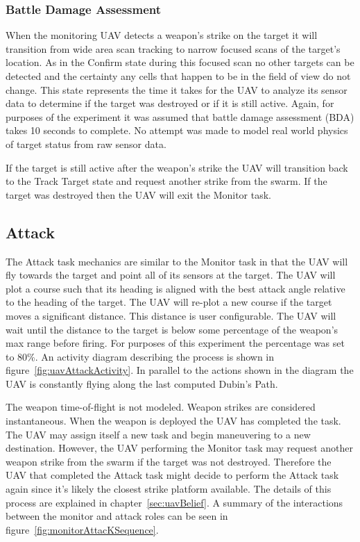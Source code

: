 \begin{multicols*}{2}
\subsubsection{Battle Damage Assessment}
When the monitoring UAV detects a weapon's strike on the target it will transition from wide area scan tracking to narrow focused scans of the target's location.  As in the Confirm state during this focused scan no other targets can be detected and the certainty any cells that happen to be in the field of view do not change.  This state represents the time it takes for the UAV to analyze its sensor data to determine if the target was destroyed or if it is still active.  Again, for purposes of the experiment it was assumed that battle damage assessment (BDA) takes 10 seconds to complete.  No attempt was made to model real world physics of target status from raw sensor data.

If the target is still active after the weapon's strike the UAV will transition back to the Track Target state and request another strike from the swarm.  If the target was destroyed then the UAV will exit the Monitor task.


\subsection{Attack}
The Attack task mechanics are similar to the Monitor task in that the UAV will fly towards the target and point all of its sensors at the target.  The UAV will plot a course such that its heading is aligned with the best attack angle relative to the heading of the target.  The UAV will re-plot a new course if the target moves a significant distance.  This distance is user configurable.  The UAV will wait until the distance to the target is below some percentage of the weapon's max range before firing.  For purposes of this experiment the percentage was set to 80\%.  An activity diagram describing the process is shown in figure~\ref{fig:uavAttackActivity}.  In parallel to the actions shown in the diagram the UAV is constantly flying along the last computed Dubin's Path.

The weapon time-of-flight is not modeled.  Weapon strikes are considered instantaneous.  When the weapon is deployed the UAV has completed the task.  The UAV may assign itself a new task and begin maneuvering to a new destination.  However, the UAV performing the Monitor task may request another weapon strike from the swarm if the target was not destroyed.  Therefore the UAV that completed the Attack task might decide to perform the Attack task again since it's likely the closest strike platform available.  The details of this process are explained in chapter~\ref{sec:uavBelief}.  A summary of the interactions between the monitor and attack roles can be seen in figure~\ref{fig:monitorAttacKSequence}.

\end{multicols*}

